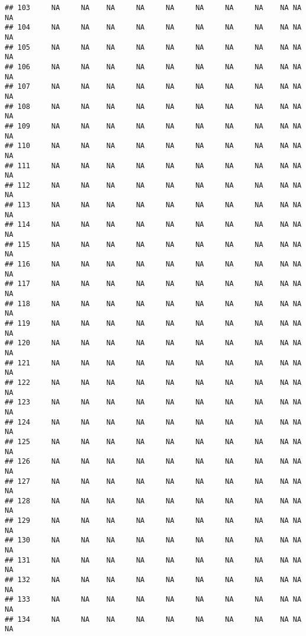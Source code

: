 \documentclass[]{article}
\begin{document}
\begin{verbatim}
## 103     NA     NA    NA     NA     NA     NA     NA     NA    NA NA          NA
## 104     NA     NA    NA     NA     NA     NA     NA     NA    NA NA          NA
## 105     NA     NA    NA     NA     NA     NA     NA     NA    NA NA          NA
## 106     NA     NA    NA     NA     NA     NA     NA     NA    NA NA          NA
## 107     NA     NA    NA     NA     NA     NA     NA     NA    NA NA          NA
## 108     NA     NA    NA     NA     NA     NA     NA     NA    NA NA          NA
## 109     NA     NA    NA     NA     NA     NA     NA     NA    NA NA          NA
## 110     NA     NA    NA     NA     NA     NA     NA     NA    NA NA          NA
## 111     NA     NA    NA     NA     NA     NA     NA     NA    NA NA          NA
## 112     NA     NA    NA     NA     NA     NA     NA     NA    NA NA          NA
## 113     NA     NA    NA     NA     NA     NA     NA     NA    NA NA          NA
## 114     NA     NA    NA     NA     NA     NA     NA     NA    NA NA          NA
## 115     NA     NA    NA     NA     NA     NA     NA     NA    NA NA          NA
## 116     NA     NA    NA     NA     NA     NA     NA     NA    NA NA          NA
## 117     NA     NA    NA     NA     NA     NA     NA     NA    NA NA          NA
## 118     NA     NA    NA     NA     NA     NA     NA     NA    NA NA          NA
## 119     NA     NA    NA     NA     NA     NA     NA     NA    NA NA          NA
## 120     NA     NA    NA     NA     NA     NA     NA     NA    NA NA          NA
## 121     NA     NA    NA     NA     NA     NA     NA     NA    NA NA          NA
## 122     NA     NA    NA     NA     NA     NA     NA     NA    NA NA          NA
## 123     NA     NA    NA     NA     NA     NA     NA     NA    NA NA          NA
## 124     NA     NA    NA     NA     NA     NA     NA     NA    NA NA          NA
## 125     NA     NA    NA     NA     NA     NA     NA     NA    NA NA          NA
## 126     NA     NA    NA     NA     NA     NA     NA     NA    NA NA          NA
## 127     NA     NA    NA     NA     NA     NA     NA     NA    NA NA          NA
## 128     NA     NA    NA     NA     NA     NA     NA     NA    NA NA          NA
## 129     NA     NA    NA     NA     NA     NA     NA     NA    NA NA          NA
## 130     NA     NA    NA     NA     NA     NA     NA     NA    NA NA          NA
## 131     NA     NA    NA     NA     NA     NA     NA     NA    NA NA          NA
## 132     NA     NA    NA     NA     NA     NA     NA     NA    NA NA          NA
## 133     NA     NA    NA     NA     NA     NA     NA     NA    NA NA          NA
## 134     NA     NA    NA     NA     NA     NA     NA     NA    NA NA          NA

\end{verbatim}
\end{document}
